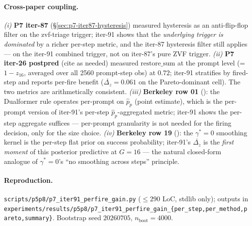 \paragraph{Cross-paper coupling.}
\emph{(i)} \textbf{P7 iter-87} (\S\ref{sec:p7-iter87-hysteresis})
measured hysteresis as an anti-flip-flop filter on the
zvf-triage trigger; iter-91 shows that the \emph{underlying
trigger is dominated} by a richer per-step metric, and the
iter-87 hysteresis filter still applies --- on the iter-91
combined trigger, not on iter-87's pure ZVF trigger. \emph{(ii)}
\textbf{P7 iter-26 postpred} (cite as needed) measured
$\mathrm{restore\_sum}$ at the prompt level (= $1 - z_{16}$,
averaged over all 2560 prompt-step obs) at $0.72$; iter-91
stratifies by fired-step and reports per-fire benefit
($\overline{\Delta_z} = 0.061$ on the Pareto-dominant cell). The
two metrics are arithmetically consistent. \emph{(iii)}
\textbf{Berkeley row 01} (\citet{su2024dualformer}): the
Dualformer rule operates per-prompt on $\hat p_p$ (point
estimate), which is the per-prompt version of iter-91's
per-step $\hat p_p$-aggregated metric; iter-91 shows the
per-step aggregate suffices --- per-prompt granularity is not
needed for the firing decision, only for the size choice.
\emph{(iv)} \textbf{Berkeley row 19}
(\citet{alphaproof2025nature}): the $\gamma^*{=}0$ smoothing
kernel is the per-step flat prior on success probability;
iter-91's $\overline{\Delta_z}$ is the \emph{first moment} of
this posterior predictive at $G{=}16$ --- the natural
closed-form analogue of $\gamma^*{=}0$'s ``no smoothing across
steps'' principle.

\paragraph{Reproduction.}
\texttt{scripts/p5p8/p7\_iter91\_perfire\_gain.py}
($\le 290$ LoC, stdlib only); outputs in
\texttt{experiments/results/p5p8/p7\_iter91\_perfire\_gain\_\{per\_step,per\_method,pareto,summary\}}.
Bootstrap seed $20260705$, $n_{\mathrm{boot}}{=}4000$.